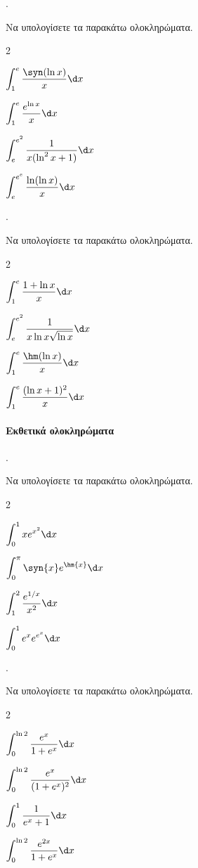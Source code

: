 \documentclass[11pt,a4paper,twocolumn]{article}
\newcounter{askhsh}
\newcommand{\askhsh}{\large\theaskhsh.\ \addtocounter{askhsh}{1}}
\begin{document}
\askhsh Να υπολογίσετε τα παρακάτω ολοκληρώματα.
\begin{multicols}{2}
\begin{alist}
\item $\displaystyle\int_{1}^{e} \dfrac{\syn(\ln x)}{x} \d x$
\item $\displaystyle\int_{1}^{e} \dfrac{e^{\ln x}}{x} \d x$
\item $\displaystyle\int_{e}^{e^2} \dfrac{1}{x(\ln^2 x + 1)} \d x$
\item $\displaystyle\int_{e}^{e^e} \dfrac{\ln(\ln x)}{x} \d x$
\end{alist}
\end{multicols}

\askhsh Να υπολογίσετε τα παρακάτω ολοκληρώματα.
\begin{multicols}{2}
\begin{alist}
\item $\displaystyle\int_{1}^{e} \dfrac{1+ \ln x}{x} \d x$
\item $\displaystyle\int_{e}^{e^2} \dfrac{1}{x \ln x \sqrt{\ln x}} \d x$
\item $\displaystyle\int_{1}^{e} \dfrac{\hm(\ln x)}{x} \d x$
\item $\displaystyle\int_{1}^{e} \dfrac{(\ln x + 1)^2}{x} \d x$
\end{alist}
\end{multicols}

\paragraph{Εκθετικά ολοκληρώματα}
\askhsh Να υπολογίσετε τα παρακάτω ολοκληρώματα.
\begin{multicols}{2}
\begin{alist}
\item $\displaystyle\int_{0}^{1} x e^{x^2} \d x$
\item $\displaystyle\int_{0}^{\pi} \syn{x} e^{\hm{x}} \d x$
\item $\displaystyle\int_{1}^{2} \dfrac{e^{1/x}}{x^2} \d x$
\item $\displaystyle\int_{0}^{1} e^x e^{e^x} \d x$
\end{alist}
\end{multicols}

\askhsh Να υπολογίσετε τα παρακάτω ολοκληρώματα.
\begin{multicols}{2}
\begin{alist}
\item $\displaystyle\int_{0}^{\ln 2} \dfrac{e^x}{1+e^x} \d x$
\item $\displaystyle\int_{0}^{\ln 2} \dfrac{e^x}{(1+e^x)^2} \d x$
\item $\displaystyle\int_{0}^{1} \dfrac{1}{e^x+1} \d x$
\item $\displaystyle\int_{0}^{\ln 2} \dfrac{e^{2x}}{1+e^x} \d x$
\end{alist}
\end{multicols}
\end{document}
